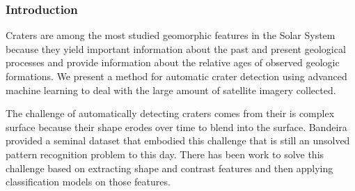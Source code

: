 \documentclass[twoside]{article}
\begin{document}


% 

%





\subsubsection*{Introduction}
\vspace{-9pt}

Craters are among the most studied geomorphic features in the Solar System because they yield important information about the past and present geological processes and provide information about the relative ages of observed geologic formations.  We present a method for automatic crater detection using advanced machine learning to deal with the large amount of satellite imagery collected.

% 
% 

The challenge of automatically detecting craters comes from their is complex surface because their shape erodes over time to blend into the surface. Bandeira \cite{bandeira_automatic_2010} provided a seminal dataset that embodied this challenge that is still an unsolved pattern recognition problem to this day. There has been work to solve this challenge based on extracting shape \cite{urbach_automatic_2009} and contrast \cite{bandeira_automatic_2010,ding_sub-kilometer_2011} features and then applying classification models on those features. 
\end{document}
